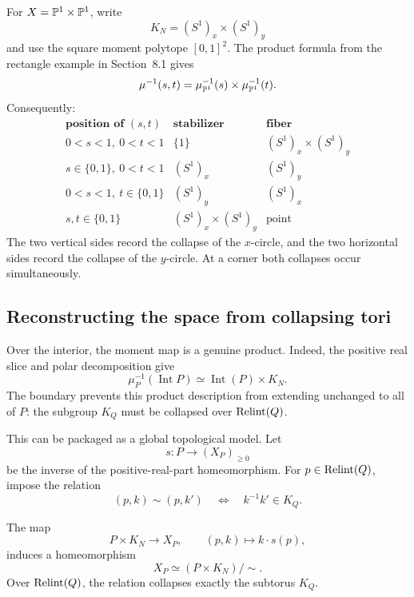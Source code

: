 \begin{example}
\label{ex:circle-collapse-product-lines}
For \(X=\mathbb{P}^1\times\mathbb{P}^1\), write
\[
K_N=(S^1)_x\times(S^1)_y
\]
and use the square moment polytope \([0,1]^2\). The product formula from
the rectangle example in Section~8.1 gives
\[
\mu^{-1}(s,t)
=
\mu_{\mathbb{P}^1}^{-1}(s)\times\mu_{\mathbb{P}^1}^{-1}(t).
\]
Consequently:
\[
\begin{array}{c|c|c}
\textbf{position of }(s,t)
&
\textbf{stabilizer}
&
\textbf{fiber}
\\
\hline
0<s<1,\ 0<t<1
&
\{1\}
&
(S^1)_x\times(S^1)_y
\\
s\in\{0,1\},\ 0<t<1
&
(S^1)_x
&
(S^1)_y
\\
0<s<1,\ t\in\{0,1\}
&
(S^1)_y
&
(S^1)_x
\\
s,t\in\{0,1\}
&
(S^1)_x\times(S^1)_y
&
\text{point}
\end{array}
\]
The two vertical sides record the collapse of the \(x\)-circle, and
the two horizontal sides record the collapse of the \(y\)-circle.
At a corner both collapses occur simultaneously.
\end{example}

\subsection{Reconstructing the space from collapsing tori}

Over the interior, the moment map is a genuine product. Indeed, the
positive real slice and polar decomposition give
\[
\mu_P^{-1}(\operatorname{Int}P)
\simeq
\operatorname{Int}(P)\times K_N.
\]
The boundary prevents this product description from extending
unchanged to all of \(P\): the subgroup \(K_Q\) must be collapsed over
\(\operatorname{Relint}(Q)\).

This can be packaged as a global topological model. Let
\[
s:P\longrightarrow(X_P)_{\geq0}
\]
be the inverse of the positive-real-part homeomorphism. For
\(p\in\operatorname{Relint}(Q)\), impose the relation
\[
(p,k)\sim(p,k')
\quad\Longleftrightarrow\quad
k^{-1}k'\in K_Q.
\]

\begin{proposition}
\label{prop:collapsing-torus-model}
The map
\[
P\times K_N\longrightarrow X_P,
\qquad
(p,k)\longmapsto k\cdot s(p),
\]
induces a homeomorphism
\[
\boxed{
X_P\simeq(P\times K_N)/{\sim}.
}
\]
Over \(\operatorname{Relint}(Q)\), the relation collapses exactly the
subtorus \(K_Q\).
\end{proposition}

